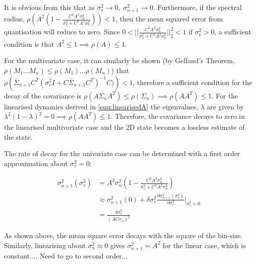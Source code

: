 \documentclass[../main.tex]{subfiles}
\begin{document}
{It is obvious from this that as $\sigma_v^2 \rightarrow 0, \; \sigma_{n+1}^2 \rightarrow 0$. Furthermore, if the spectral radius, $\rho \left(A^2(1 - \frac{C^2 A^2\sigma_n^2}{\sigma_v^2 + C^2 A^2 \sigma_n^2}) \right) < 1$, then the mean squared error from quantisation will reduce to zero. Since $0 < ||\frac{C^2 A^2\sigma_n^2}{\sigma_v^2 + C^2 A^2 \sigma_n^2}||^2_2 < 1$ if $\sigma_v^2 > 0$, a sufficient condition is that $A^2 \leq 1 \implies \rho(A) \leq 1$.

For the multivariate case, it can similarly be shown (by Gelfand's Theorem, $\rho(M_1 ... M_n) \leq \rho(M_1)...\rho(M_n)$) that $\rho\left(\bar{\Sigma}_{n+1}C^T (\sigma_v^2 I + C \bar{\Sigma}_{n+1} C^T)^{-1} C)\right) < 1$, therefore a sufficient condition for the decay of the covariance is $\rho(A \Sigma_n A^T) \leq \rho(\Sigma_n) \implies \rho(A A^T) \leq 1$. For the linearised dynamics derived in \cref{equ:linearisedA} the eigenvalues, $\lambda$ are given by $\lambda^2(1-\lambda)^2 = 0 \implies \rho(AA^T) \leq 1$. Therefore, the covariance decays to zero in the linearised multivariate case and the 2D state becomes a lossless estimate of the state.

The rate of decay for the univariate case can be determined with a first order approximation about $\sigma_v^2 = 0$:

\begin{align}
    \sigma_{n+1}^2(\sigma_v^2) &= A^2\sigma_n^2(1 - \frac{C^2 A^2\sigma_n^2}{\sigma_v^2 + C^2 A^2 \sigma_n^2}) \\
    &\approx \sigma_{n+1}^2(0) + \delta \sigma_v^2 \frac{\partial \sigma_{n+1}^2(\sigma_v^2)}{\partial \sigma_v^2}|_{\sigma_v^2 = 0} \\
    &= \frac{\delta \sigma_v^2}{(AC\sigma_n)^2}
\end{align}

As shown above, the mean square error decays with the square of the bin-size. Similarly, linearising about $\sigma_n^2 \approx 0$ gives $\sigma_{n+1}^2 = A^2$ for the linear case, which is constant.... Need to go to second order...

} %
\onlyinsubfile{}
\end{document}
